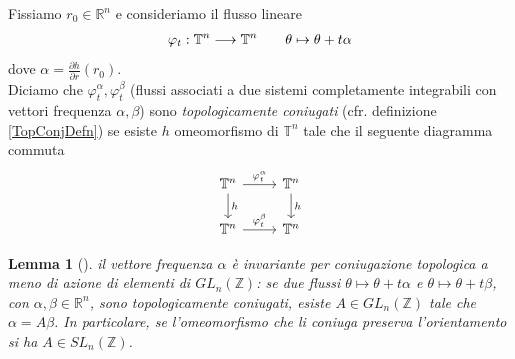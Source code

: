 \documentclass[twoside, 11pt]{amsbook}
\newcommand{\0}{{(0)}}
\newcommand{\3}{{(3)}}
\theoremstyle{colonplain}
\newtheorem{lemma}[thm]{Lemma}
\theoremstyle{colondefinition}
\theoremstyle{colonremark}
\numberwithin{equation}{chapter}
\begin{document}
Fissiamo $r_0 \in \mathbb{R}^n$ e consideriamo il flusso lineare
\begin{align}
    \varphi_t : \mathbb{T}^n \longrightarrow \mathbb{T}^n \qquad \theta \mapsto \theta + t\alpha \notag
\end{align}
dove $\alpha = \frac{\partial h}{\partial r}(r_0)$. \\
Diciamo che $\varphi^\alpha_t, \varphi^\beta_t$ (flussi associati a due sistemi completamente integrabili con vettori frequenza $\alpha, \beta$) sono \textit{topologicamente coniugati} (cfr. definizione \ref{TopConjDefn}) se esiste $h$ omeomorfismo di $\mathbb{T}^n$ tale che il seguente diagramma commuta
\[
\begin{tikzcd}
\mathbb{T}^n
    \arrow[r, "\varphi^\alpha_{t}"]
    \arrow[d, "h"]
&
\mathbb{T}^n
    \arrow[d, "h"]
\\
\mathbb{T}^n
    \arrow[r, "\varphi^\beta_t"]
&
\mathbb{T}^n
\end{tikzcd}
\]
\begin{lemma}[\cite{Fejoz01}]\label{FlowTopConj} il vettore frequenza $\alpha$ è invariante per coniugazione topologica a meno di azione di elementi di $GL_n(\mathbb{Z})$: se due flussi $\theta \mapsto \theta + t\alpha$ e $\theta \mapsto \theta + t\beta$, con $\alpha, \beta \in \mathbb{R}^n$, sono topologicamente coniugati, esiste $A \in GL_n(\mathbb{Z})$ tale che $\alpha = A\beta$. In particolare, se l'omeomorfismo che li coniuga preserva l'orientamento si ha $A \in SL_n(\mathbb{Z})$.
\end{lemma}
\end{document}
